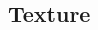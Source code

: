 \documentclass[a4paper, fontsize=8pt, landscape, DIV=1]{scrartcl}
\begin{document}
\begin{multicols*}{4}
		 
		\subsection{Texture}
		
		
		
	\end{multicols*}
	\setcounter{secnumdepth}{3}
\end{document}
